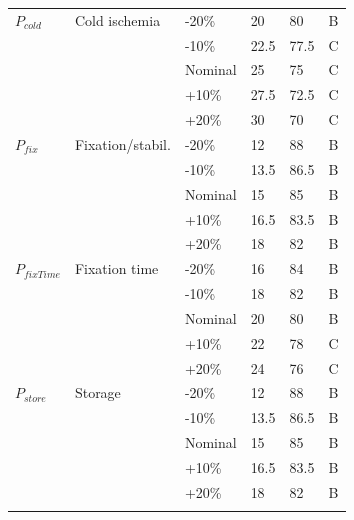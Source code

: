 \documentclass[preprint,12pt]{elsarticle}
\begin{document}
\begin{longtable}{@{}C{1.8cm} L{3.35cm} C{1.55cm} R{1.2cm} R{1.2cm} C{1.1cm}@{}}
\addlinespace[0.16em]
$P_{cold}$ & Cold ischemia & -20\% & 20 & 80 & B \\
 &  & -10\% & 22.5 & 77.5 & C \\
 &  & Nominal & 25 & 75 & C \\
 &  & +10\% & 27.5 & 72.5 & C \\
 &  & +20\% & 30 & 70 & C \\
\addlinespace[0.16em]
$P_{fix}$ & Fixation/stabil. & -20\% & 12 & 88 & B \\
 &  & -10\% & 13.5 & 86.5 & B \\
 &  & Nominal & 15 & 85 & B \\
 &  & +10\% & 16.5 & 83.5 & B \\
 &  & +20\% & 18 & 82 & B \\
\addlinespace[0.16em]
$P_{fixTime}$ & Fixation time & -20\% & 16 & 84 & B \\
 &  & -10\% & 18 & 82 & B \\
 &  & Nominal & 20 & 80 & B \\
 &  & +10\% & 22 & 78 & C \\
 &  & +20\% & 24 & 76 & C \\
\addlinespace[0.16em]
$P_{store}$ & Storage & -20\% & 12 & 88 & B \\
 &  & -10\% & 13.5 & 86.5 & B \\
 &  & Nominal & 15 & 85 & B \\
 &  & +10\% & 16.5 & 83.5 & B \\
 &  & +20\% & 18 & 82 & B \\
\addlinespace[0.16em]
\end{longtable}
\normalsize
\end{document}

